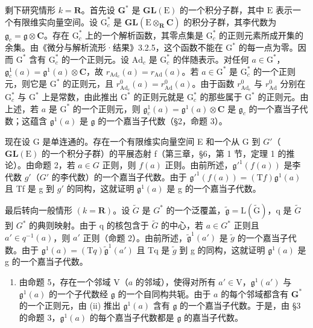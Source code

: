 剩下研究情形 \(k = \mathbf{R}\)。首先设 \(\mathbf{G}^*\) 是 \(\mathbf{GL}(\mathrm{E})\) 的一个积分子群，其中 \(\mathrm{E}\) 表示一个有限维实向量空间。设 \(\mathrm{G}_c^*\) 是 \(\mathbf{GL}(\mathrm{E} \otimes_{\mathbf{R}} \mathbf{C})\) 的积分子群，其李代数为 \(\mathfrak{g}_c = \mathfrak{g} \otimes \mathbf{C}\)。存在 \(\mathrm{G}_c^*\) 上的一个解析函数，其零点集是 \(\mathrm{G}_c^*\) 的正则元素所成开集的余集。由《微分与解析流形·结果》3.2.5，这个函数不能在 \(\mathrm{G}^*\) 的每一点为零。因而 \(\mathrm{G}^*\) 含有 \(\mathrm{G}_c^*\) 的一个正则元。设 \(\mathrm{Ad}_c\) 是 \(\mathrm{G}_c^*\) 的伴随表示。对任何 \(a \in \mathrm{G}^*\)，\(\mathfrak{g}_c^1(a) = \mathfrak{g}^1(a) \otimes \mathbf{C}\)，故 \(r_{\mathrm{Ad}_c}(a) = r_{\mathrm{Ad}}(a)\)。若 \(a \in \mathrm{G}^*\) 是 \(\mathrm{G}_c^*\) 的一个正则元，则它是 \(\mathrm{G}^*\) 的正则元，且 \(r_{\mathrm{Ad}_c}^0(a) = r_{\mathrm{Ad}}^0(a)\)。由于函数 \(r_{\mathrm{Ad}_c}^0\) 与 \(r_{\mathrm{Ad}}^0\) 分别在 \(\mathrm{G}_c^*\) 与 \(\mathrm{G}^*\) 上是常数，由此推出 \(\mathrm{G}^*\) 的正则元就是 \(\mathrm{G}_c^*\) 的那些属于 \(\mathrm{G}^*\) 的正则元。由上述，若 \(a\) 是 \(\mathrm{G}^*\) 的一个正则元，则 \(\mathfrak{g}_c^1(a) = \mathfrak{g}^1(a) \otimes \mathbf{C}\) 是 \(\mathfrak{g}_c\) 的一个嘉当子代数；这蕴含 \(\mathfrak{g}^1(a)\) 是 \(\mathfrak{g}\) 的一个嘉当子代数（§2，命题 3）。

现在设 G 是单连通的。存在一个有限维实向量空间 E 和一个从 G 到 \(G'\)（\(\mathbf{GL}(\mathrm{E})\) 的一个积分子群）的平展态射 f（第三章，§6，第 1 节，定理 1 的推论）。由命题 2，若 \(a \in G\) 正则，则 \(f(a)\) 正则。由前所述，\(\mathfrak{g}'^{1}(f(a))\) 是李代数 \(g'\)（\(G'\) 的李代数）的一个嘉当子代数。由于 \(\mathfrak{g}'^{1}(f(a)) = (\mathrm{T}f)\mathfrak{g}^{1}(a)\) 且 Tf 是 g 到 \(g'\) 的同构，这就证明 \(\mathfrak{g}^{1}(a)\) 是 g 的一个嘉当子代数。

最后转向一般情形 \((k = \mathbf{R})\)。设 \(\tilde{G}\) 是 \(G^{*}\) 的一个泛覆盖，\(\tilde{\mathfrak{g}} = \mathrm{L}(\tilde{\mathrm{G}})\)，q 是 \(\tilde{G}\) 到 \(G^{*}\) 的典则映射。由于 q 的核包含于 \(\tilde{G}\) 的中心，若 \(a \in G^{*}\) 正则且 \(a' \in q^{-1}(a)\)，则 \(a'\) 正则（命题 2）。由前所述，\(\tilde{\mathfrak{g}}^{1}(a')\) 是 \(\tilde{g}\) 的一个嘉当子代数。由于 \(\mathfrak{g}^{1}(a) = (\mathrm{T}q)\tilde{\mathfrak{g}}^{1}(a')\) 且 Tq 是 \(\tilde{g}\) 到 g 的同构，这就证明 \(\mathfrak{g}^{1}(a)\) 是 g 的一个嘉当子代数。

\begin{enumerate}
\def\labelenumi{(\roman{enumi})}
\setcounter{enumi}{2}
\tightlist
\item
  由命题 5，存在一个邻域 \(\mathrm{V}\)（\(a\) 的邻域），使得对所有 \(a' \in \mathrm{V}\)，\(\mathfrak{g}^1(a')\) 与 \(\mathfrak{g}^1(a)\) 的一个子代数经 \(\mathfrak{g}\) 的一个自同构共轭。由于 \(a\) 的每个邻域都含有 \(\mathbf{G}^*\) 的一个正则元，由 (ii) 推出 \(\mathfrak{g}^1(a)\) 含有 \(\mathfrak{g}\) 的一个嘉当子代数。于是，由 §3 的命题 3，\(\mathfrak{g}^1(a)\) 的每个嘉当子代数都是 \(\mathfrak{g}\) 的嘉当子代数。
\end{enumerate}

